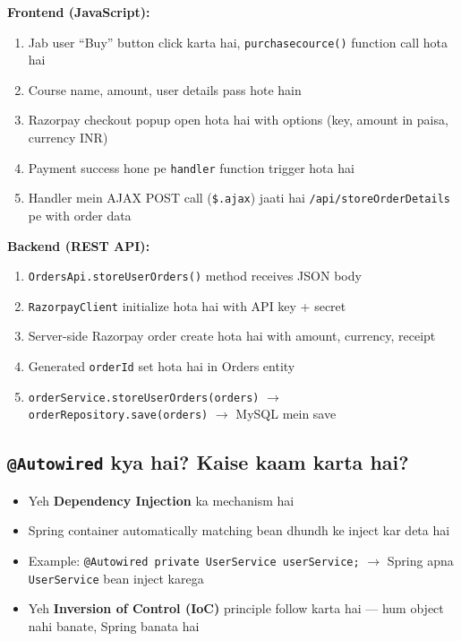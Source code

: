 \documentclass[12pt,a4paper]{article}
\begin{document}
\begin{answerbox}
\textbf{Frontend (JavaScript):}
\begin{enumerate}
    \item Jab user ``Buy'' button click karta hai, \texttt{purchasecource()} function call hota hai
    \item Course name, amount, user details pass hote hain
    \item Razorpay checkout popup open hota hai with options (key, amount in paisa, currency INR)
    \item Payment success hone pe \texttt{handler} function trigger hota hai
    \item Handler mein AJAX POST call (\texttt{\$.ajax}) jaati hai \texttt{/api/storeOrderDetails} pe with order data
\end{enumerate}

\textbf{Backend (REST API):}
\begin{enumerate}
    \item \texttt{OrdersApi.storeUserOrders()} method receives JSON body
    \item \texttt{RazorpayClient} initialize hota hai with API key + secret
    \item Server-side Razorpay order create hota hai with amount, currency, receipt
    \item Generated \texttt{orderId} set hota hai in Orders entity
    \item \texttt{orderService.storeUserOrders(orders)} $\rightarrow$ \texttt{orderRepository.save(orders)} $\rightarrow$ MySQL mein save
\end{enumerate}
\end{answerbox}

\subsection{\texttt{@Autowired} kya hai? Kaise kaam karta hai?}

\begin{answerbox}
\begin{itemize}
    \item Yeh \textbf{Dependency Injection} ka mechanism hai
    \item Spring container automatically matching bean dhundh ke inject kar deta hai
    \item Example: \texttt{@Autowired private UserService userService;} $\rightarrow$ Spring apna \texttt{UserService} bean inject karega
    \item Yeh \textbf{Inversion of Control (IoC)} principle follow karta hai --- hum object nahi banate, Spring banata hai
\end{itemize}
\end{answerbox}
\end{document}
